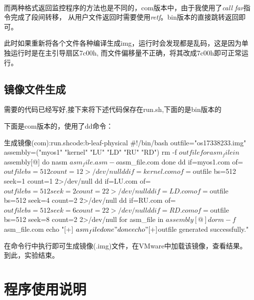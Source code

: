 \documentclass[a4paper, 11pt]{article} %
\newcounter{code}
\begin{document}
\paragraph{}
而两种格式返回监控程序的方法也是不同的，com版本中，由于我使用了\textit{call far}指令完成了段间转移，
从用户文件返回时需要使用\textit{retf}。bin版本的直接跳转返回即可。

此时如果重新将各个文件各种编译生成img，运行时会发现都是乱码，这是因为单独运行时是在主引导扇区7c00h,
而文件偏移量不正确，将其改成7c00h即可正常运行。

\subsection{镜像文件生成}
需要的代码已经写好,接下来将下述代码保存在run.sh,下面的是bin版本的

下面是com版本的，使用了dd命令：
\begin{code}{生成镜像(com):run.sh}{code:b-leaf-physical}
  #!/bin/bash
  outfile="os17338233.img"
  assembly=("myos1" "kernel" "LU" "LD" "RU" "RD")
  rm -f ${outfile}
  for asm_file in ${assembly[@]}
  do
    nasm ${asm_file}.asm -o ${asm_file}.com
  done
  dd if=myos1.com of=${outfile} bs=512 count=1 2>/dev/null
  dd if=kernel.com of=${outfile} bs=512 seek=1 count=1 2>/dev/null
  dd if=LU.com of=${outfile} bs=512 seek=2 count=2 2>/dev/null
  dd if=LD.com of=${outfile} bs=512 seek=4 count=2 2>/dev/null
  dd if=RU.com of=${outfile} bs=512 seek=6 count=2 2>/dev/null
  dd if=RD.com of=${outfile} bs=512 seek=8 count=2 2>/dev/null
  for asm_file in ${assembly[@]}
  do
    rm -f ${asm_file}.com
      echo "[+] ${asm_file} done"
  done
  
  echo "[+] ${outfile} generated successfully."\end{code}
在命令行中执行即可生成镜像(.img)文件，在VMware中加载该镜像，查看结果。到此，实验结束。

\section{程序使用说明}
\end{document}
